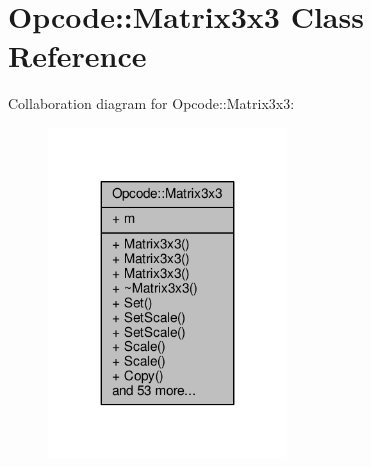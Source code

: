 \hypertarget{classOpcode_1_1Matrix3x3}{}\section{Opcode\+:\+:Matrix3x3 Class Reference}
\label{classOpcode_1_1Matrix3x3}


Collaboration diagram for Opcode\+:\+:Matrix3x3\+:
\nopagebreak
\begin{figure}[H]
\begin{center}
\leavevmode
\includegraphics[width=179pt]{d0/d37/classOpcode_1_1Matrix3x3__coll__graph}
\end{center}
\end{figure}

